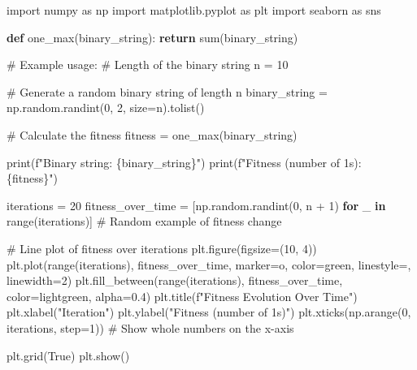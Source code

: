 \documentclass[
  letterpaper,
  DIV=11,
  numbers=noendperiod]{scrreprt}
\newenvironment{Shaded}{\begin{snugshade}}{\end{snugshade}}
\newcommand{\BuiltInTok}[1]{\textcolor[rgb]{0.00,0.23,0.31}{#1}}
\newcommand{\CommentTok}[1]{\textcolor[rgb]{0.37,0.37,0.37}{#1}}
\newcommand{\ControlFlowTok}[1]{\textcolor[rgb]{0.00,0.23,0.31}{\textbf{#1}}}
\newcommand{\DecValTok}[1]{\textcolor[rgb]{0.68,0.00,0.00}{#1}}
\newcommand{\FloatTok}[1]{\textcolor[rgb]{0.68,0.00,0.00}{#1}}
\newcommand{\ImportTok}[1]{\textcolor[rgb]{0.00,0.46,0.62}{#1}}
\newcommand{\KeywordTok}[1]{\textcolor[rgb]{0.00,0.23,0.31}{\textbf{#1}}}
\newcommand{\NormalTok}[1]{\textcolor[rgb]{0.00,0.23,0.31}{#1}}
\newcommand{\OperatorTok}[1]{\textcolor[rgb]{0.37,0.37,0.37}{#1}}
\newcommand{\SpecialCharTok}[1]{\textcolor[rgb]{0.37,0.37,0.37}{#1}}
\newcommand{\SpecialStringTok}[1]{\textcolor[rgb]{0.13,0.47,0.30}{#1}}
\newcommand{\StringTok}[1]{\textcolor[rgb]{0.13,0.47,0.30}{#1}}
\newcommand{\VariableTok}[1]{\textcolor[rgb]{0.07,0.07,0.07}{#1}}
\begin{document}
\begin{Shaded}
\begin{Highlighting}[]
\ImportTok{import}\NormalTok{ numpy }\ImportTok{as}\NormalTok{ np}
\ImportTok{import}\NormalTok{ matplotlib.pyplot }\ImportTok{as}\NormalTok{ plt}
\ImportTok{import}\NormalTok{ seaborn }\ImportTok{as}\NormalTok{ sns}

\KeywordTok{def}\NormalTok{ one\_max(binary\_string):}
    \ControlFlowTok{return} \BuiltInTok{sum}\NormalTok{(binary\_string)}

\CommentTok{\# Example usage: \# Length of the binary string}
\NormalTok{n }\OperatorTok{=} \DecValTok{10}

\CommentTok{\# Generate a random binary string of length n}
\NormalTok{binary\_string }\OperatorTok{=}\NormalTok{ np.random.randint(}\DecValTok{0}\NormalTok{, }\DecValTok{2}\NormalTok{, size}\OperatorTok{=}\NormalTok{n).tolist()}

\CommentTok{\# Calculate the fitness}
\NormalTok{fitness }\OperatorTok{=}\NormalTok{ one\_max(binary\_string)}

\BuiltInTok{print}\NormalTok{(}\SpecialStringTok{f"Binary string: }\SpecialCharTok{\{}\NormalTok{binary\_string}\SpecialCharTok{\}}\SpecialStringTok{"}\NormalTok{)}
\BuiltInTok{print}\NormalTok{(}\SpecialStringTok{f"Fitness (number of 1s): }\SpecialCharTok{\{}\NormalTok{fitness}\SpecialCharTok{\}}\SpecialStringTok{"}\NormalTok{)}


\NormalTok{iterations }\OperatorTok{=} \DecValTok{20}
\NormalTok{fitness\_over\_time }\OperatorTok{=}\NormalTok{ [np.random.randint(}\DecValTok{0}\NormalTok{, n }\OperatorTok{+} \DecValTok{1}\NormalTok{) }\ControlFlowTok{for}\NormalTok{ \_ }\KeywordTok{in} \BuiltInTok{range}\NormalTok{(iterations)]  }\CommentTok{\# Random example of fitness change}

\CommentTok{\# Line plot of fitness over iterations}
\NormalTok{plt.figure(figsize}\OperatorTok{=}\NormalTok{(}\DecValTok{10}\NormalTok{, }\DecValTok{4}\NormalTok{))}
\NormalTok{plt.plot(}\BuiltInTok{range}\NormalTok{(iterations), fitness\_over\_time, marker}\OperatorTok{=}\StringTok{\textquotesingle{}o\textquotesingle{}}\NormalTok{, color}\OperatorTok{=}\StringTok{\textquotesingle{}green\textquotesingle{}}\NormalTok{, linestyle}\OperatorTok{=}\StringTok{\textquotesingle{}{-}\textquotesingle{}}\NormalTok{, linewidth}\OperatorTok{=}\DecValTok{2}\NormalTok{)}
\NormalTok{plt.fill\_between(}\BuiltInTok{range}\NormalTok{(iterations), fitness\_over\_time, color}\OperatorTok{=}\StringTok{\textquotesingle{}lightgreen\textquotesingle{}}\NormalTok{, alpha}\OperatorTok{=}\FloatTok{0.4}\NormalTok{)}
\NormalTok{plt.title(}\SpecialStringTok{f"Fitness Evolution Over Time"}\NormalTok{)}
\NormalTok{plt.xlabel(}\StringTok{"Iteration"}\NormalTok{)}
\NormalTok{plt.ylabel(}\StringTok{"Fitness (number of 1s)"}\NormalTok{)}
\NormalTok{plt.xticks(np.arange(}\DecValTok{0}\NormalTok{, iterations, step}\OperatorTok{=}\DecValTok{1}\NormalTok{))  }\CommentTok{\# Show whole numbers on the x{-}axis}

\NormalTok{plt.grid(}\VariableTok{True}\NormalTok{)}
\NormalTok{plt.show()}
\end{Highlighting}
\end{Shaded}
\end{document}
